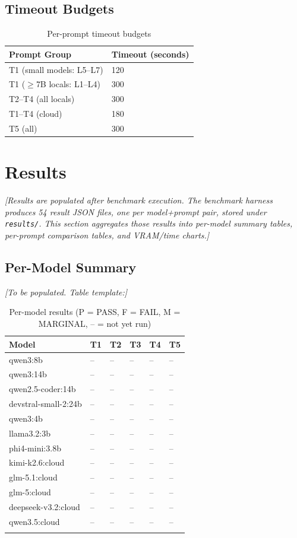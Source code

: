 \documentclass[11pt,a4paper]{article}
\begin{document}
\subsection{Timeout Budgets}

\begin{table}[H]
\centering
\begin{tabular}{ll}
\toprule
Prompt Group & Timeout (seconds) \\
\midrule
T1 (small models: L5--L7) & 120 \\
T1 ($\geq$7B locals: L1--L4) & 300 \\
T2--T4 (all locals) & 300 \\
T1--T4 (cloud) & 180 \\
T5 (all) & 300 \\
\bottomrule
\end{tabular}
\caption{Per-prompt timeout budgets}
\end{table}

\section{Results}

\textit{[Results are populated after benchmark execution. The benchmark harness produces 54 result JSON files, one per model+prompt pair, stored under \texttt{results/}. This section aggregates those results into per-model summary tables, per-prompt comparison tables, and VRAM/time charts.]}

\subsection{Per-Model Summary}

\textit{[To be populated. Table template:]}

\begin{longtable}{llllll}
\toprule
Model & T1 & T2 & T3 & T4 & T5 \\
\midrule
\endhead
qwen3:8b & -- & -- & -- & -- & -- \\
qwen3:14b & -- & -- & -- & -- & -- \\
qwen2.5-coder:14b & -- & -- & -- & -- & -- \\
devstral-small-2:24b & -- & -- & -- & -- & -- \\
qwen3:4b & -- & -- & -- & -- & -- \\
llama3.2:3b & -- & -- & -- & -- & -- \\
phi4-mini:3.8b & -- & -- & -- & -- & -- \\
kimi-k2.6:cloud & -- & -- & -- & -- & -- \\
glm-5.1:cloud & -- & -- & -- & -- & -- \\
glm-5:cloud & -- & -- & -- & -- & -- \\
deepseek-v3.2:cloud & -- & -- & -- & -- & -- \\
qwen3.5:cloud & -- & -- & -- & -- & -- \\
\bottomrule
\caption{Per-model results (P = PASS, F = FAIL, M = MARGINAL, -- = not yet run)}
\end{longtable}
\end{document}
